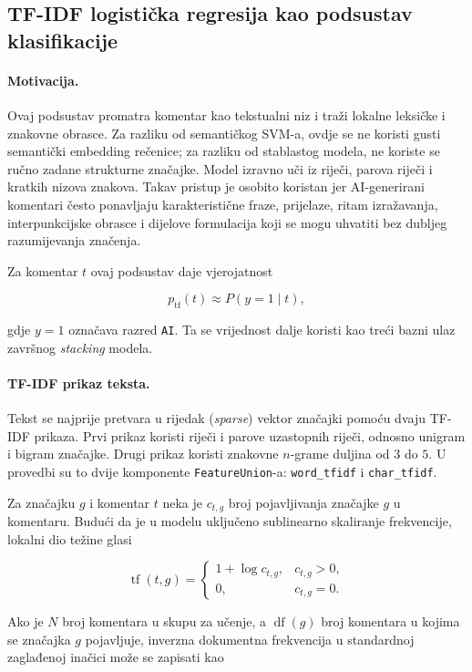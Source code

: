 \documentclass{article}
\begin{document}
\subsection{TF-IDF logistička regresija kao podsustav klasifikacije}

\paragraph{Motivacija.}
Ovaj podsustav promatra komentar kao tekstualni niz i traži lokalne leksičke i znakovne obrasce. Za razliku od semantičkog SVM-a, ovdje se ne koristi gusti semantički embedding rečenice; za razliku od stablastog modela, ne koriste se ručno zadane strukturne značajke. Model izravno uči iz riječi, parova riječi i kratkih nizova znakova. Takav pristup je osobito koristan jer AI-generirani komentari često ponavljaju karakteristične fraze, prijelaze, ritam izražavanja, interpunkcijske obrasce i dijelove formulacija koji se mogu uhvatiti bez dubljeg razumijevanja značenja.

Za komentar $t$ ovaj podsustav daje vjerojatnost

\[
p_{\mathrm{tf}}(t) \approx P(y=1\mid t),
\]

gdje $y=1$ označava razred \texttt{AI}. Ta se vrijednost dalje koristi kao treći bazni ulaz završnog \textit{stacking} modela.

\paragraph{TF-IDF prikaz teksta.}
Tekst se najprije pretvara u rijedak (\textit{sparse}) vektor značajki pomoću dvaju TF-IDF prikaza. Prvi prikaz koristi riječi i parove uzastopnih riječi, odnosno unigram i bigram značajke. Drugi prikaz koristi znakovne $n$-grame duljina od $3$ do $5$. U provedbi su to dvije komponente \texttt{FeatureUnion}-a: \texttt{word\_tfidf} i \texttt{char\_tfidf}.

Za značajku $g$ i komentar $t$ neka je $c_{t,g}$ broj pojavljivanja značajke $g$ u komentaru. Budući da je u modelu uključeno sublinearno skaliranje frekvencije, lokalni dio težine glasi

\[
\operatorname{tf}(t,g)=
\begin{cases}
1+\log c_{t,g}, & c_{t,g}>0,\\
0, & c_{t,g}=0.
\end{cases}
\]

Ako je $N$ broj komentara u skupu za učenje, a $\operatorname{df}(g)$ broj komentara u kojima se značajka $g$ pojavljuje, inverzna dokumentna frekvencija u standardnoj zaglađenoj inačici može se zapisati kao
\end{document}
